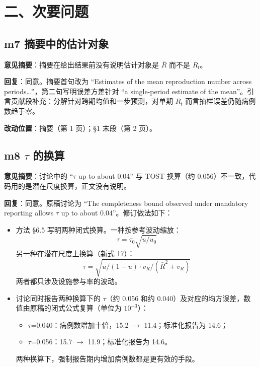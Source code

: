 \documentclass[UTF8,a4paper,11pt,fontset=none]{ctexart}
\providecommand{\tightlist}{\setlength{\itemsep}{1pt}\setlength{\parskip}{0pt}}
\begin{document}
\section*{二、次要问题}

\subsection*{m7 摘要中的估计对象}

\textbf{意见摘要}：摘要在给出结果前没有说明估计对象是 \(\bar R\) 而不是 \(R_t\)。

\textbf{回复}：同意。摘要首句改为 ``Estimates of the mean reproduction number across periods\ldots{}''，第二句写明误差方差针对 ``a single-period estimate of the mean''。引言贡献段补充：分解针对跨期均值和一步预测，对单期 \(R_t\) 而言抽样误差仍随病例数趋于零。

\textbf{改动位置}：摘要（第 1 页）；§1 末段（第 2 页）。

\subsection*{\texorpdfstring{m8 \(\tau\) 的换算}{m8 \textbackslash tau 的换算}}

\textbf{意见摘要}：讨论中的 ``\(\tau\) up to about 0.04'' 与 TOST 换算（约 0.056）不一致，代码用的是潜在尺度换算，正文没有说明。

\textbf{回复}：同意。原稿讨论为 ``The completeness bound observed under mandatory reporting allows \(\tau\) up to about 0.04''。修订做法如下：

\begin{itemize}
\tightlist
\item
  方法 §6.5 写明两种闭式换算。一种按参考波动缩放：\vspace{1.2ex}
\[\tau=\tau_0\sqrt{u/u_0}\]
另一种在潜在尺度上换算（新式 17）：\vspace{1.2ex}
\[\tau=\sqrt{u/(1-u)\cdot v_R/(\bar R^2+v_R)}\]
两者都只涉及设施参与率的波动。
\item
  讨论同时报告两种换算下的 \(\tau\)（约 0.056 和约 0.040）及对应的均方误差，数值由原稿的闭式公式复算（单位为 \(10^{-3}\)）：

  \begin{itemize}
  \tightlist
  \item
    \(\tau\)=0.040：病例数增加十倍，15.2 \(\rightarrow\) 11.4；标准化报告为 14.6；
  \item
    \(\tau\)=0.056：15.7 \(\rightarrow\) 11.9；标准化报告为 14.6。
  \end{itemize}

  两种换算下，强制报告期内增加病例数都是更有效的手段。
\end{itemize}
\end{document}
